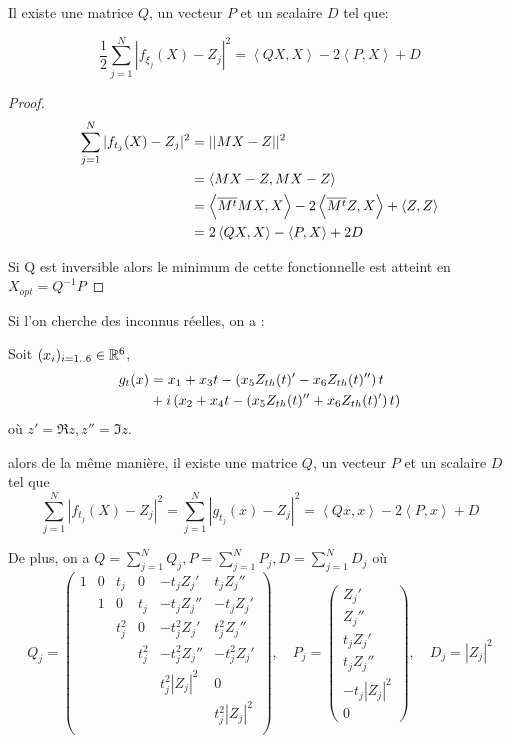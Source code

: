 \begin{prop}
Il existe une matrice $Q$, un vecteur $P$ et un scalaire $D$ tel que:

\[
\frac{1}{2}\sum_{j=1}^N |f_{\xi_j}(X) -Z_j|^2 = \left<Q X,X\right> -2\left<P,X\right> +D
\]
\end{prop}
\begin{proof}
\begin{align*}
\sum_{j=1}^N |f_{t_j}(X) -Z_j|^2&= ||MX-Z||^2\\
&= \left<MX-Z,MX-Z\right>\\
&=\left<{\overline{M^t}}MX,X\right> - 2\left<{\overline{M^t}}Z,X\right> + \left<Z,Z\right>\\
&= 2\left<Q X,X\right> -\left<P,X\right> +2D
\end{align*}

Si Q est inversible alors le minimum de cette fonctionnelle est atteint en $X_{opt} = Q^{-1}P$

\end{proof}

Si l'on cherche des inconnus réelles, on a :

Soit $(x_i)_{i=1..6} \in \mathbb R^6$, 
\begin{align*}
g_t(x) &= 
{x}_1 + {x}_3 t - \left(x_5 Z_{th}(t)' - x_6 Z_{th}(t)''\right)t  \\
&+ i\left(
{x}_2 + {x}_4 t - \left(x_5 Z_{th}(t)'' + x_6 Z_{th}(t)'\right)t
\right)
\end{align*}
où $z'= \Re{z}, z''=\Im{z}$.

alors de la même manière, il existe une matrice $Q$, un vecteur $P$ et un scalaire $D$ tel que
\[
\sum_{j=1}^N|f_{t_j}(X) -Z_j|^2  = \sum_{j=1}^N|g_{t_j}(x) -Z_j|^2 = \left<Q x,x\right> -2\left<P,x\right> + D
\]

De plus, on a $Q = \sum_{j=1}^N Q_j, P = \sum_{j=1}^N P_j ,D=\sum_{j=1}^N D_j$ où
\[
Q_j =
\begin{pmatrix}
1 & 0 & t_j & 0 & -t_jZ_j' & t_jZ_j'' \\
& 1 & 0 & t_j & -t_jZ_j'' & -t_jZ_j' \\
&   & t_j^2 & 0 & -t_j^2Z_j' & t_j^2Z_j'' \\
&   &  & t_j^2 & -t_j^2Z_j'' & -t_j^2Z_j' \\
&   &  &  & t_j^2|Z_j|^2 & 0 \\
&   &  &  &  & t_j^2|Z_j|^2 \\
\end{pmatrix}
,\quad
P_j =
\begin{pmatrix}
Z_j' \\ Z_j'' \\ t_j Z_j' \\ t_j Z_j''  \\ -t_j |Z_j|^2  \\ 0
\end{pmatrix}
,\quad
D_j = |Z_j|^2
\]

